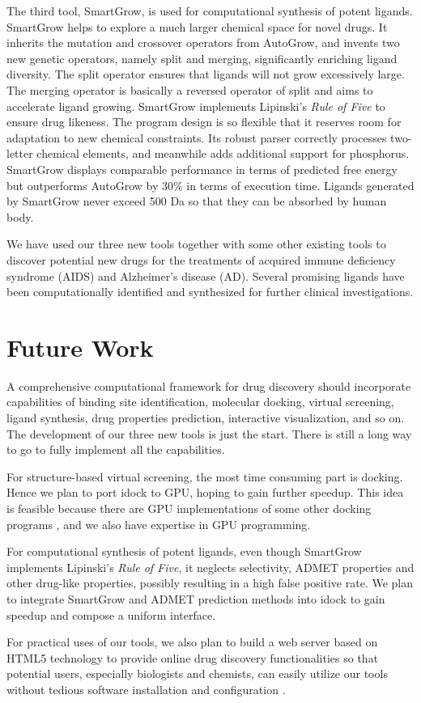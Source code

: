 The third tool, SmartGrow, is used for computational synthesis of potent ligands. SmartGrow helps to explore a much larger chemical space for novel drugs. It inherits the mutation and crossover operators from AutoGrow, and invents two new genetic operators, namely split and merging, significantly enriching ligand diversity. The split operator ensures that ligands will not grow excessively large. The merging operator is basically a reversed operator of split and aims to accelerate ligand growing. SmartGrow implements Lipinski's \textit{Rule of Five} \citep{168-2004} to ensure drug likeness. The program design is so flexible that it reserves room for adaptation to new chemical constraints. Its robust parser correctly processes two-letter chemical elements, and meanwhile adds additional support for phosphorus. SmartGrow displays comparable performance in terms of predicted free energy but outperforms AutoGrow by 30\% in terms of execution time. Ligands generated by SmartGrow never exceed 500 Da so that they can be absorbed by human body. 

We have used our three new tools together with some other existing tools to discover potential new drugs for the treatments of acquired immune deficiency syndrome (AIDS) and Alzheimer's disease (AD). Several promising ligands have been computationally identified and synthesized for further clinical investigations.

\section{Future Work}

A comprehensive computational framework for drug discovery should incorporate capabilities of binding site identification, molecular docking, virtual screening, ligand synthesis, drug properties prediction, interactive visualization, and so on. The development of our three new tools is just the start. There is still a long way to go to fully implement all the capabilities.

For structure-based virtual screening, the most time consuming part is docking. Hence we plan to port idock to GPU, hoping to gain further speedup. This idea is feasible because there are GPU implementations of some other docking programs \citep{723-2009,652-2010,779-2011}, and we also have expertise in GPU programming.

For computational synthesis of potent ligands, even though SmartGrow implements Lipinski's \textit{Rule of Five}, it neglects selectivity, ADMET properties and other drug-like properties, possibly resulting in a high false positive rate. We plan to integrate SmartGrow and ADMET prediction methods into idock to gain speedup and compose a uniform interface.

For practical uses of our tools, we also plan to build a web server based on HTML5 technology to provide online drug discovery functionalities so that potential users, especially biologists and chemists, can easily utilize our tools without tedious software installation and configuration \citep{677-2011}.

\chapterend
